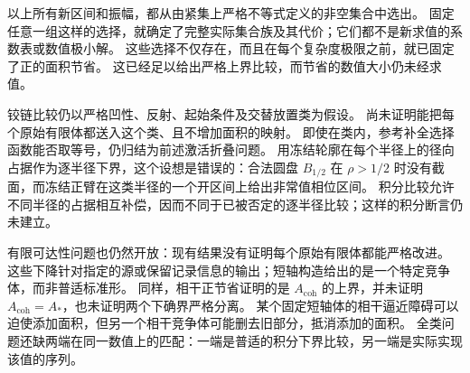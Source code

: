以上所有新区间和振幅，都从由紧集上严格不等式定义的非空集合中选出。
固定任意一组这样的选择，就确定了完整实际集合族及其代价；它们都不是新求值的系数表或数值极小解。
这些选择不仅存在，而且在每个复杂度极限之前，就已固定了正的面积节省。
这已经足以给出严格上界比较，而节省的数值大小仍未经求值。

铰链比较仍以严格凹性、反射、起始条件及交替放置类为假设。
尚未证明能把每个原始有限体都送入这个类、且不增加面积的映射。
即使在类内，参考补全选择函数能否取等号，仍归结为前述激活折叠问题。
用冻结轮廓在每个半径上的径向占据作为逐半径下界，这个设想是错误的：合法圆盘 $B_{1/2}$ 在 $\rho>1/2$ 时没有截面，而冻结正臂在这类半径的一个开区间上给出非常值相位区间。
积分比较允许不同半径的占据相互补偿，因而不同于已被否定的逐半径比较；这样的积分断言仍未建立。

有限可达性问题也仍然开放：现有结果没有证明每个原始有限体都能严格改进。
这些下降针对指定的源或保留记录信息的输出；短轴构造给出的是一个特定竞争体，而非普适标准形。
同样，相干正节省证明的是 $A_{\mathrm{coh}}$ 的上界，并未证明 $A_{\mathrm{coh}}=A_*$，也未证明两个下确界严格分离。
某个固定短轴体的相干逼近障碍可以迫使添加面积，但另一个相干竞争体可能删去旧部分，抵消添加的面积。
全类问题还缺两端在同一数值上的匹配：一端是普适的积分下界比较，另一端是实际实现该值的序列。
